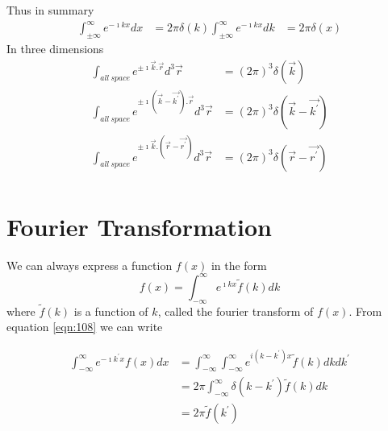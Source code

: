 		Thus in summary
		\begin{eqnarray}\label{eqn:103-104}
			\int_{\pm \infty}^{\infty} e^{-\imath k x} dx &= 2\pi \delta(k)
			\int_{\pm \infty}^{\infty} e^{-\imath k x} dk &= 2\pi \delta(x)
		\end{eqnarray}
		In three dimensions
		\begin{eqnarray}\label{eqn:105-107}
			\int_{all\ space} e^{\pm \imath \vec{k} . \vec{r}} d^3\vec{r} &= (2\pi)^3 \delta(\vec{k}) \\
			\int_{all\ space} e^{\pm \imath (\vec{k} - \vec{k^\prime}) . \vec{r}} d^3\vec{r} &= (2\pi)^3 \delta(\vec{k} - \vec{k^\prime}) \\
			\int_{all\ space} e^{\pm \imath \vec{k} . (\vec{r} - \vec{r^\prime})} d^3\vec{r} &= (2\pi)^3 \delta(\vec{r} - \vec{r^\prime}) \\
		\end{eqnarray}
		
	\section{Fourier Transformation}
		We can always express a function $f(x)$ in the form
		\begin{equation}\label{eqn:108}
			f(x) = \int_{-\infty}^{\infty} e^{\imath k x} \tilde{f}(k) dk
		\end{equation}
		where $\tilde{f}(k)$ is a function of $k$, called the fourier transform of $f(x)$. From equation \ref{eqn:108} we can write
		
		\begin{eqnarray}\label{eqn:109}
			\int_{-\infty}^{\infty} e^{-\imath k^\prime x} f(x) dx 
			&= \int_{-\infty}^{\infty} \int_{-\infty}^{\infty} e^{i(k-k^\prime) x} \tilde{f}(k) dk dk^\prime \nonumber \\
			&= 2 \pi \int_{-\infty}^{\infty} \delta(k-k^\prime) \tilde{f}(k) dk \nonumber \\
			&= 2\pi \tilde{f}(k^\prime) 
		\end{eqnarray}
		
